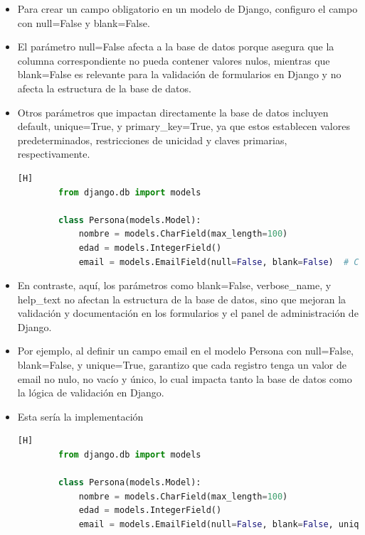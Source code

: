 \documentclass{article}
\begin{document}
        \begin{itemize}	
            \item Para crear un campo obligatorio en un modelo de Django, configuro el campo con null=False y blank=False. 
            \item El parámetro null=False afecta a la base de datos porque asegura que la columna correspondiente no pueda contener valores nulos, mientras que blank=False es relevante para la validación de formularios en Django y no afecta la estructura de la base de datos. 
            \item Otros parámetros que impactan directamente la base de datos incluyen default, unique=True, y primary\_key=True, ya que estos establecen valores predeterminados, restricciones de unicidad y claves primarias, respectivamente.

        \begin{lstlisting}[language=Python,caption={Creando superusuario}][H]
        from django.db import models
        
        class Persona(models.Model):
            nombre = models.CharField(max_length=100)
            edad = models.IntegerField()
            email = models.EmailField(null=False, blank=False)  # Campo obligatorio
        \end{lstlisting}
        
            \item En contraste, aquí, los parámetros como blank=False, verbose\_name, y help\_text no afectan la estructura de la base de datos, sino que mejoran la validación y documentación en los formularios y el panel de administración de Django. 
            \item Por ejemplo, al definir un campo email en el modelo Persona con null=False, blank=False, y unique=True, garantizo que cada registro tenga un valor de email no nulo, no vacío y único, lo cual impacta tanto la base de datos como la lógica de validación en Django.
            \item Esta sería la implementación

        \begin{lstlisting}[language=Python,caption={Creando superusuario}][H]
        from django.db import models

        class Persona(models.Model):
            nombre = models.CharField(max_length=100)
            edad = models.IntegerField()
            email = models.EmailField(null=False, blank=False, unique=True, help_text="Por favor, ingrese un email valido")  # Campo obligatorio y unico
        \end{lstlisting}
        \end{itemize}
\end{document}
